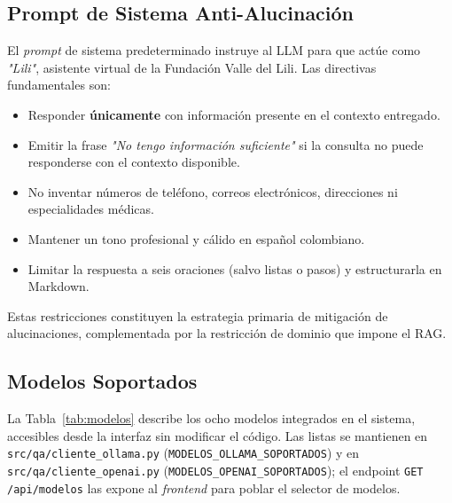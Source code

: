 \documentclass[conference]{IEEEtran}
\newcommand{\code}[1]{\texttt{\small #1}}
\begin{document}
\subsection{Prompt de Sistema Anti-Alucinación}

El \textit{prompt} de sistema predeterminado instruye al LLM para que actúe
como \textit{"Lili"}, asistente virtual de la Fundación Valle del Lili. Las
directivas fundamentales son:

\begin{itemize}
    \item Responder \textbf{únicamente} con información presente en el
          contexto entregado.
    \item Emitir la frase \textit{"No tengo información suficiente"} si la
          consulta no puede responderse con el contexto disponible.
    \item No inventar números de teléfono, correos electrónicos, direcciones
          ni especialidades médicas.
    \item Mantener un tono profesional y cálido en español colombiano.
    \item Limitar la respuesta a seis oraciones (salvo listas o pasos) y
          estructurarla en Markdown.
\end{itemize}

Estas restricciones constituyen la estrategia primaria de mitigación de
alucinaciones, complementada por la restricción de dominio que impone el RAG.

\subsection{Modelos Soportados}

La Tabla~\ref{tab:modelos} describe los ocho modelos integrados en el
sistema, accesibles desde la interfaz sin modificar el código. Las listas
se mantienen en \code{src/qa/cliente\_ollama.py}
(\code{MODELOS\_OLLAMA\_SOPORTADOS}) y en \code{src/qa/cliente\_openai.py}
(\code{MODELOS\_OPENAI\_SOPORTADOS}); el endpoint
\code{GET /api/modelos} las expone al \textit{frontend} para poblar el
selector de modelos.
\end{document}
